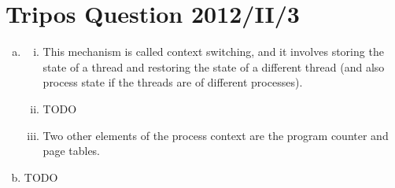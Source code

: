 \documentclass[12pt]{article}
\begin{document}
\section{Tripos Question 2012/II/3}
\begin{enumerate}[(a)]
    \item \begin{enumerate}[(i)]
              \item This mechanism is called context switching, and it involves storing the state of a thread and restoring the state of a different thread (and also process state if the threads are of different processes).
              \item TODO
              \item Two other elements of the process context are the program counter and page tables.
          \end{enumerate}
    \item TODO
\end{enumerate}
\end{document}

